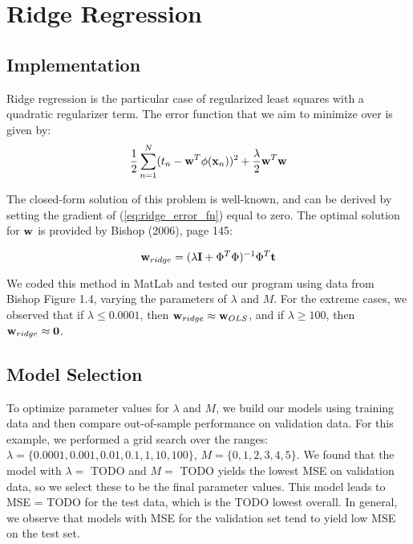 
\section{Ridge Regression}\label{sec:ridge_reg}

\subsection{Implementation}
Ridge regression is the particular case of regularized least squares with a quadratic regularizer term.  The error function that we aim to minimize over is given by:
\begin{equation} \label{eq:ridge_error_fn}
\frac{1}{2} \sum_{n=1}^{N} (t_n - \boldsymbol{\mathbf{w}}^T \phi (\boldsymbol{\mathbf{x}}_n) )^2 + \frac{\lambda}{2} \boldsymbol{\mathbf{w}}^T \boldsymbol{\mathbf{w}}
\end{equation}

The closed-form solution of this problem is well-known, and can be derived by setting the gradient of (\ref{eq:ridge_error_fn}) equal to zero.  The optimal solution for $\boldsymbol{\mathbf{w}}$ is provided by Bishop (2006), page 145:

\begin{equation} \label{eq:ridge_sol}
\boldsymbol{\mathbf{w}}_{ridge} = (\lambda \boldsymbol{\mathbf{I}} + \Phi^T \Phi)^{-1} \Phi^T \boldsymbol{\mathbf{t}}
\end{equation}

We coded this method in MatLab and tested our program using data from Bishop Figure 1.4, varying the parameters of $\lambda$ and $M$.  For the extreme cases, we observed that if $\lambda \leq 0.0001$, then $\boldsymbol{\mathbf{w}}_{ridge} \approx \boldsymbol{\mathbf{w}}_{OLS}$, and if $\lambda \geq 100$, then $\boldsymbol{\mathbf{w}}_{ridge} \approx \boldsymbol{\mathbf{0}}$.



\subsection{Model Selection}
To optimize parameter values for $\lambda$ and $M$, we build our models using training data and then compare out-of-sample performance on validation data.  For this example, we performed a grid search over the ranges: $\lambda = \{0.0001, 0.001, 0.01, 0.1,1,10,100\}$, $M = \{0,1,2,3,4,5\}$.  We found that the model with $\lambda = $ TODO and $M = $ TODO yields the lowest MSE on validation data, so we select these to be the final parameter values.  This model leads to MSE = TODO for the test data, which is the TODO lowest overall.  In general, we observe that models with MSE for the validation set tend to yield low MSE on the test set.  

